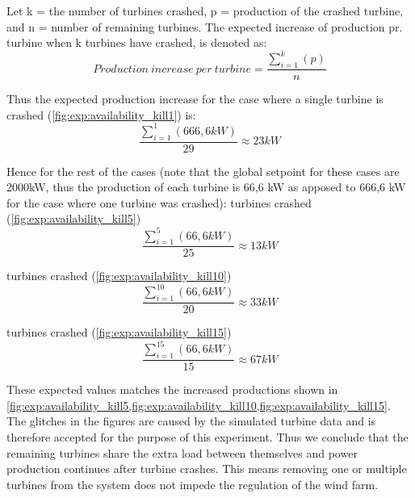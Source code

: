 Let k = the number of turbines crashed, p = production of the crashed turbine, and n = number of remaining turbines. The expected increase of production pr. turbine when k turbines have crashed, is denoted as: 
$$Production~increase~per~turbine = \frac{\sum\limits_{i=1}^k(p)}{n}$$

Thus the expected production increase for the case where a single turbine is crashed (\cref{fig:exp:availability_kill1}) is: $$\frac{\sum\limits_{i=1}^1(666,6kW)}{29}\approx23kW$$

Hence for the rest of the cases (note that the global setpoint for these cases are 2000kW, thus the production of each turbine is 66,6 kW as apposed to 666,6 kW for the case where one turbine was crashed):
\newline\newline
{} turbines crashed (\cref{fig:exp:availability_kill5}) $$\frac{\sum\limits_{i=1}^5(66,6kW)}{25}\approx13kW$$

 turbines crashed (\cref{fig:exp:availability_kill10}) $$\frac{\sum\limits_{i=1}^{10}(66,6kW)}{20}\approx33kW$$

 turbines crashed (\cref{fig:exp:availability_kill15}) $$\frac{\sum\limits_{i=1}^{15}(66,6kW)}{15}\approx67kW$$

These expected values matches the increased productions shown in \cref{fig:exp:availability_kill5,fig:exp:availability_kill10,fig:exp:availability_kill15}. The glitches  in the figures are caused by the simulated turbine data and is therefore accepted for the purpose of this experiment. Thus we conclude that the remaining turbines share the extra load between themselves and power production continues after turbine crashes.
This means removing one or multiple turbines from the system does not impede the regulation of the wind farm.


